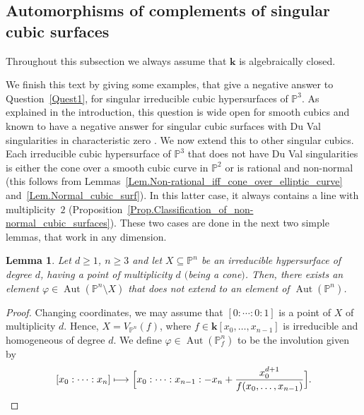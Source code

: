 \documentclass[JEP,XML,SOM,Unicode,NoFloatCountersInSection,published]{cedram}
\newcommand\mto{\mathchoice{\longmapsto}{\mapsto}{\mapsto}{\mapsto}}
\newtheorem{lemma}{Lemma}[section]
\theoremstyle{definition}
\renewcommand\k{{\mathbf k}}
\newcommand\p{{\mathbb P}}\let\PP\p
\newcommand{\kk}{\mathbf{k}}
\DeclareMathOperator{\Aut}{Aut}
\begin{document}
\subsection{Automorphisms of complements of singular cubic surfaces}
Throughout this subsection we always assume that $\kk$ is algebraically closed.

We finish this text by giving some examples, that give a negative answer to Question~\eqref{Quest1}, for singular irreducible cubic hypersurfaces of $\p^3$. As explained in the introduction, this question is wide open for smooth cubics and known to have a negative answer for singular cubic surfaces with Du Val singularities
in characteristic zero \cite[Th.\,C \& Th.\,4.3]{CheDub}. We now extend this to other singular cubics.
Each irreducible cubic hypersurface of $\p^3$ that does not have Du Val singularities is either the cone
over a smooth cubic curve in $\PP^2$ or is rational and non-normal (this follows from Lemmas~\ref{Lem.Non-rational_iff_cone_over_elliptic_curve} and~\ref{Lem.Normal_cubic_surf}). In this latter case, it always contains a line with multiplicity~$2$ (Proposition~\ref{Prop.Classification_of_non-normal_cubic_surfaces}). These two cases are done in the next two simple lemmas, that work in any dimension.

\begin{lemma}\label{Lem:Cone}
Let $d\ge 1$, $n\ge 3$ and let $X\subseteq \p^n$ be an irreducible hypersurface of degree $d$, having a point of multiplicity $d$ $($\ie being a cone$)$. Then, there exists an element $\varphi\in \Aut(\p^n\setminus X)$ that does not extend to an element of $\Aut(\p^n)$.
\end{lemma}
\begin{proof}
Changing coordinates, we may assume that $[0:\cdots:0:1]$ is a point of $X$ of multiplicity $d$. Hence, $X=V_{\p^n}(f)$, where $f\in \k[x_0,\ldots,x_{n-1}]$ is irreducible and homogeneous of degree $d$. We define $\varphi\in \Aut(\p^n_f)$ to be the involution given by
\[
[x_0:\cdots:x_n]\mto \Bigl[x_0:\cdots:x_{n-1}:-x_n+ \frac{x_0^{d+1}}{f(x_0,\ldots,x_{n-1})} \Bigr].\qedhere
\]
\end{proof}
\end{document}
